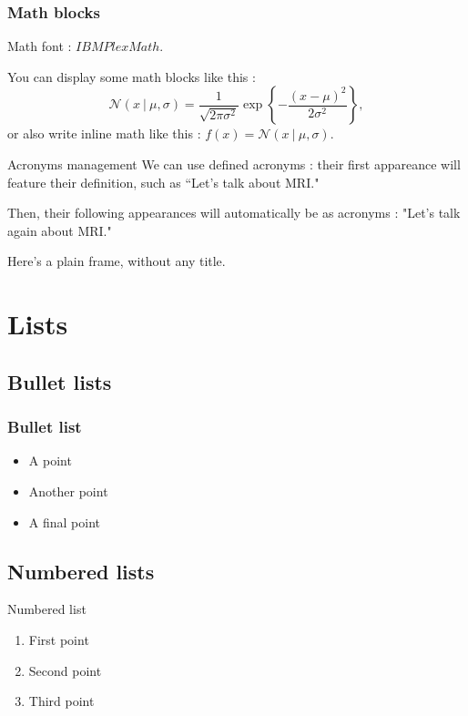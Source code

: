 \documentclass[
  11pt, %
  aspectratio=169, %
]{beamer}
\begin{document}
\begin{frame}
  \frametitle{Math blocks}

  Math font : $IBM Plex Math$.

  \vfill
  You can display some math blocks like this :
  \[\mathcal{N}(x~|~\mu, \sigma) = \frac{1}{\sqrt{2\pi\sigma^2}}\exp\left\{-\frac{(x-\mu)^2}{2\sigma^2}\right\},\]
  or also write inline math like this : $f(x) = \mathcal{N}(x~|~\mu, \sigma)$.

\end{frame}

\begin{frame}{Acronyms management}
  We can use defined acronyms : their first appareance will feature their definition, such as “Let's talk about \ac{MRI}."
  \vfill

  Then, their following appearances will automatically be as acronyms : "Let's talk again about \ac{MRI}."
\end{frame}

\begin{frame}

  Here’s a plain frame, without any title.

\end{frame}

\section{Lists}

\subsection{Bullet lists}
\begin{frame}
  \frametitle{Bullet list}

  \begin{itemize}
    \item A point
    \item Another point
    \item A final point
  \end{itemize}

\end{frame}

\subsection{Numbered lists}
\begin{frame}{Numbered list}
  \begin{enumerate}
    \item First point
    \item Second point
    \item Third point
  \end{enumerate}

\end{frame}
\end{document}
